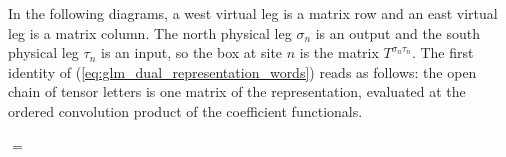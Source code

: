 In the following diagrams, a west virtual leg is a matrix row and an
east virtual leg is a matrix column. The north physical leg $\sigma_n$
is an output and the south physical leg $\tau_n$ is an input, so the
box at site $n$ is the matrix $T^{\sigma_n\tau_n}$. The first identity
of (\ref{eq:glm_dual_representation_words}) reads as follows: the open
chain of tensor letters is one matrix of the representation, evaluated
at the ordered convolution product of the coefficient functionals.
\begin{tenkzequation}
    \begin{tenkz}[rows={wire}, cols=4, bonds=none]
        \tn[at=(1,3),name=D,skin=dots,
            ports={180:virtual,0:virtual}]{}
    \end{tenkz}
    $=$
    \begin{tenkz}[rows={wire}, cols=2, bonds=none]
    \end{tenkz}
\end{tenkzequation}

